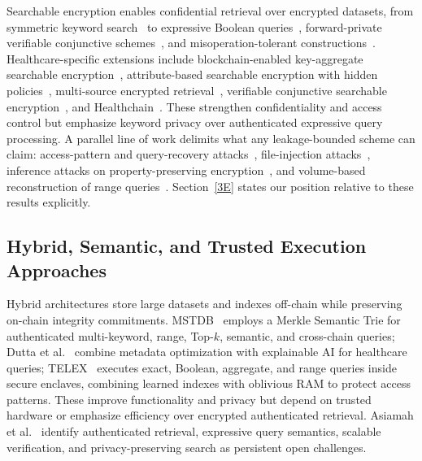 \documentclass[journal]{IEEEtran}
\theoremstyle{tight}
\theoremstyle{remark}
\theoremstyle{plain}
\begin{document}
Searchable encryption enables confidential retrieval over encrypted datasets, from symmetric keyword search~\cite{Curtmola2006} to expressive Boolean queries~\cite{Cash2013}, forward-private verifiable conjunctive schemes~\cite{Guo}, and misoperation-tolerant constructions~\cite{Zheng}. Healthcare-specific extensions include blockchain-enabled key-aggregate searchable encryption~\cite{LeeJoonYoung}, attribute-based searchable encryption with hidden policies~\cite{Zhang}, multi-source encrypted retrieval~\cite{Yao}, verifiable conjunctive searchable encryption~\cite{Lu}, and Healthchain~\cite{Li}. These strengthen confidentiality and access control but emphasize keyword privacy over authenticated expressive query processing. A parallel line of work delimits what any leakage-bounded scheme can claim: access-pattern and query-recovery attacks~\cite{Islam2012,CashLeakage2015}, file-injection attacks~\cite{Zhang2016}, inference attacks on property-preserving encryption~\cite{Naveed2015}, and volume-based reconstruction of range queries~\cite{Grubbs2018}. Section~\ref{3E} states our position relative to these results explicitly.
 
\subsection{Hybrid, Semantic, and Trusted Execution Approaches}
\label{2D}
Hybrid architectures store large datasets and indexes off-chain while preserving on-chain integrity commitments. MSTDB~\cite{Zhou} employs a Merkle Semantic Trie for authenticated multi-keyword, range, Top-$k$, semantic, and cross-chain queries; Dutta et al.~\cite{Dutta} combine metadata optimization with explainable AI for healthcare queries; TELEX~\cite{WuHaotian} executes exact, Boolean, aggregate, and range queries inside secure enclaves, combining learned indexes with oblivious RAM to protect access patterns. These improve functionality and privacy but depend on trusted hardware or emphasize efficiency over encrypted authenticated retrieval. Asiamah et al.~\cite{Asiamah} identify authenticated retrieval, expressive query semantics, scalable verification, and privacy-preserving search as persistent open challenges.
 
\end{document}
